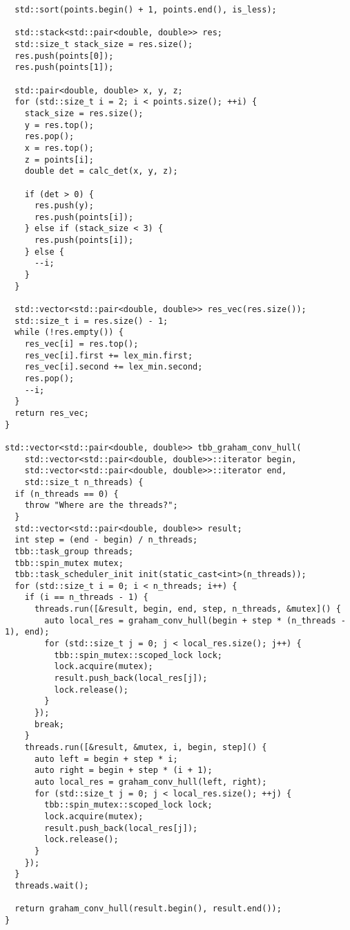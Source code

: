 \documentclass{report}
\begin{document}
\begin{lstlisting}
  std::sort(points.begin() + 1, points.end(), is_less);

  std::stack<std::pair<double, double>> res;
  std::size_t stack_size = res.size();
  res.push(points[0]);
  res.push(points[1]);

  std::pair<double, double> x, y, z;
  for (std::size_t i = 2; i < points.size(); ++i) {
    stack_size = res.size();
    y = res.top();
    res.pop();
    x = res.top();
    z = points[i];
    double det = calc_det(x, y, z);

    if (det > 0) {
      res.push(y);
      res.push(points[i]);
    } else if (stack_size < 3) {
      res.push(points[i]);
    } else {
      --i;
    }
  }

  std::vector<std::pair<double, double>> res_vec(res.size());
  std::size_t i = res.size() - 1;
  while (!res.empty()) {
    res_vec[i] = res.top();
    res_vec[i].first += lex_min.first;
    res_vec[i].second += lex_min.second;
    res.pop();
    --i;
  }
  return res_vec;
}

std::vector<std::pair<double, double>> tbb_graham_conv_hull(
    std::vector<std::pair<double, double>>::iterator begin,
    std::vector<std::pair<double, double>>::iterator end,
    std::size_t n_threads) {
  if (n_threads == 0) {
    throw "Where are the threads?";
  }
  std::vector<std::pair<double, double>> result;
  int step = (end - begin) / n_threads;
  tbb::task_group threads;
  tbb::spin_mutex mutex;
  tbb::task_scheduler_init init(static_cast<int>(n_threads));
  for (std::size_t i = 0; i < n_threads; i++) {
    if (i == n_threads - 1) {
      threads.run([&result, begin, end, step, n_threads, &mutex]() {
        auto local_res = graham_conv_hull(begin + step * (n_threads - 1), end);
        for (std::size_t j = 0; j < local_res.size(); j++) {
          tbb::spin_mutex::scoped_lock lock;
          lock.acquire(mutex);
          result.push_back(local_res[j]);
          lock.release();
        }
      });
      break;
    }
    threads.run([&result, &mutex, i, begin, step]() {
      auto left = begin + step * i;
      auto right = begin + step * (i + 1);
      auto local_res = graham_conv_hull(left, right);
      for (std::size_t j = 0; j < local_res.size(); ++j) {
        tbb::spin_mutex::scoped_lock lock;
        lock.acquire(mutex);
        result.push_back(local_res[j]);
        lock.release();
      }
    });
  }
  threads.wait();

  return graham_conv_hull(result.begin(), result.end());
}

\end{lstlisting}
\end{document}

